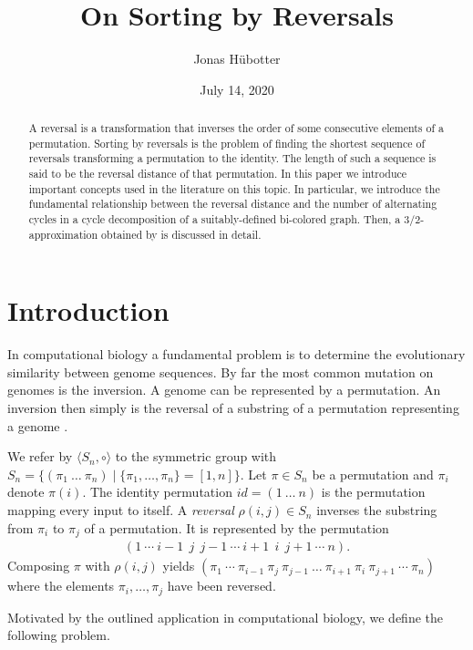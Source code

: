 \documentclass[11pt,DIV=11]{scrartcl}
\title{On Sorting by Reversals}
\author{Jonas Hübotter}
\date{July 14, 2020}
\theoremstyle{definition}
\theoremstyle{remark}
\begin{document}
\maketitle

\begin{abstract}
    A reversal is a transformation that inverses the order of some consecutive elements of a permutation. Sorting by reversals is the problem of finding the shortest sequence of reversals transforming a permutation to the identity. The length of such a sequence is said to be the reversal distance of that permutation. In this paper we introduce important concepts used in the literature on this topic. In particular, we introduce the fundamental relationship between the reversal distance and the number of alternating cycles in a cycle decomposition of a suitably-defined bi-colored graph. Then, a $3/2$-approximation obtained by \citeauthor*{Christie1998} is discussed in detail.
\end{abstract}

\section{Introduction}

In computational biology a fundamental problem is to determine the evolutionary similarity between genome sequences. By far the most common mutation on genomes is the inversion. A genome can be represented by a permutation. An inversion then simply is the reversal of a substring of a permutation representing a genome \cite{Kececioglu1995}.

We refer by $\langle S_n, \circ \rangle$ to the symmetric group with $S_n = \{(\pi_1\ \dots\ \pi_n) \mid \{\pi_1, \dots, \pi_n\} = [1,n]\}$. Let $\pi \in S_n$ be a permutation and $\pi_i$ denote $\pi(i)$. The identity permutation $id = (1\ \dots\ n)$ is the permutation mapping every input to itself. A \textit{reversal} $\rho(i,j) \in S_n$ inverses the substring from $\pi_i$ to $\pi_j$ of a permutation. It is represented by the permutation
\begin{align*}
    (1\ \cdots\ i-1\ \ j\ \ j-1\ \cdots\ i+1\ \ i\ \ j+1\ \cdots\ n).
\end{align*}
Composing $\pi$ with $\rho(i,j)$ yields $(\pi_1\ \cdots\ \pi_{i-1}\ \pi_j\ \pi_{j-1}\ \dots\ \pi_{i+1}\ \pi_i\ \pi_{j+1}\ \cdots\ \pi_n)$ where the elements $\pi_i, \dots, \pi_j$ have been reversed.

Motivated by the outlined application in computational biology, we define the following problem.
\end{document}
